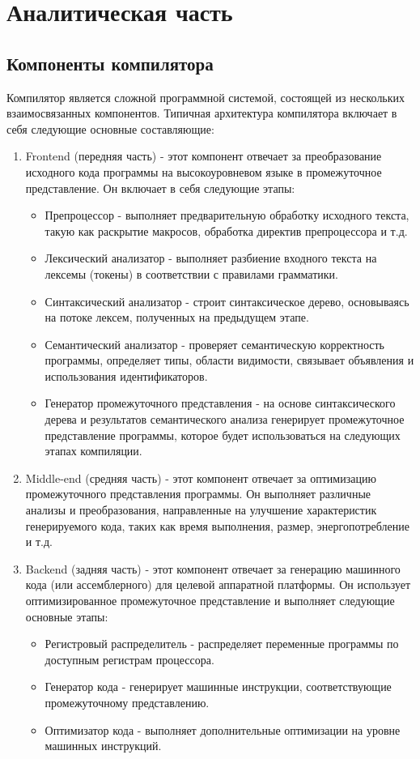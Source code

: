 \chapter{Аналитическая часть}
\section{Компоненты компилятора}
Компилятор является сложной программной системой, состоящей из нескольких взаимосвязанных компонентов. Типичная архитектура компилятора включает в себя следующие основные составляющие:

\begin{enumerate}
    \item Frontend (передняя часть) - этот компонент отвечает за преобразование исходного кода программы на высокоуровневом языке в промежуточное представление. Он включает в себя следующие этапы:
    \begin{itemize}[label = ---]
        \item Препроцессор - выполняет предварительную обработку исходного текста, такую как раскрытие макросов, обработка директив препроцессора и т.д.
        \item Лексический анализатор - выполняет разбиение входного текста на лексемы (токены) в соответствии с правилами грамматики.
        \item Синтаксический анализатор - строит синтаксическое дерево, основываясь на потоке лексем, полученных на предыдущем этапе.
        \item Семантический анализатор - проверяет семантическую корректность программы, определяет типы, области видимости, связывает объявления и использования идентификаторов.
        \item Генератор промежуточного представления - на основе синтаксического дерева и результатов семантического анализа генерирует промежуточное представление программы, которое будет использоваться на следующих этапах компиляции.
    \end{itemize}
    \item Middle-end (средняя часть) - этот компонент отвечает за оптимизацию промежуточного представления программы. Он выполняет различные анализы и преобразования, направленные на улучшение характеристик генерируемого кода, таких как время выполнения, размер, энергопотребление и т.д.
    \item Backend (задняя часть) - этот компонент отвечает за генерацию машинного кода (или ассемблерного) для целевой аппаратной платформы. Он использует оптимизированное промежуточное представление и выполняет следующие основные этапы:
    \begin{itemize}[label = ---]
        \item Регистровый распределитель - распределяет переменные программы по доступным регистрам процессора.
        \item Генератор кода - генерирует машинные инструкции, соответствующие промежуточному представлению.
        \item Оптимизатор кода - выполняет дополнительные оптимизации на уровне машинных инструкций.
    \end{itemize}
\end{enumerate}


